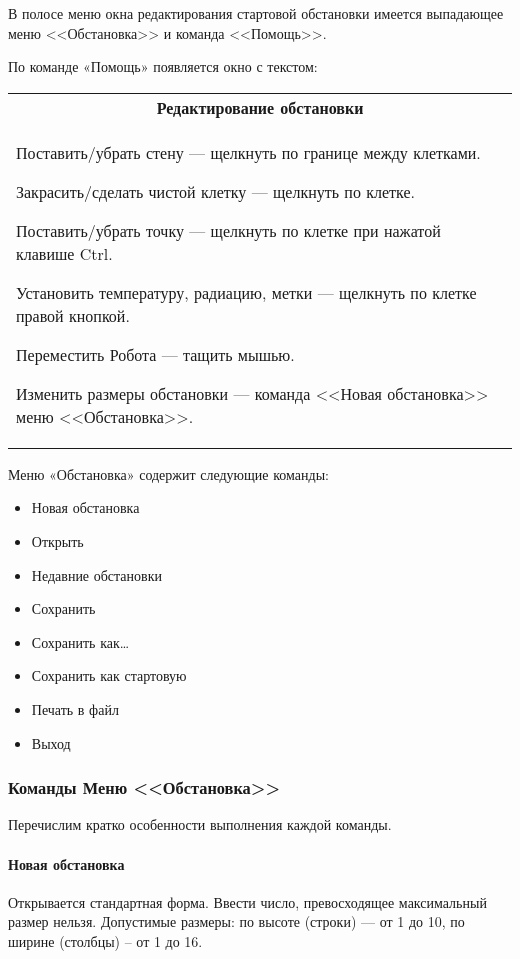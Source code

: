 В полосе меню окна редактирования стартовой обстановки  имеется выпадающее меню <<Обстановка>> и команда <<Помощь>>.

По команде  «Помощь» появляется окно с текстом:
\begin{center}
\begin{tabular}{|p{16cm}|}
\hline
\multicolumn{1}{|c|}{\textbf{Редактирование обстановки}}\\

Поставить/убрать стену --- щелкнуть по границе между клетками.

Закрасить/сделать чистой клетку --- щелкнуть по клетке.

Поставить/убрать точку --- щелкнуть по клетке при нажатой клавише Ctrl.

Установить температуру, радиацию, метки --- щелкнуть по клетке правой кнопкой.

Переместить Робота --- тащить мышью.

Изменить размеры обстановки --- команда <<Новая обстановка>> меню <<Обстановка>>.\\
\hline
\end{tabular}
\end{center}

Меню «Обстановка» содержит следующие команды:
\begin{itemize}
\item Новая обстановка
\item Открыть
\item Недавние обстановки
\item Сохранить
\item Сохранить как\dots
\item Сохранить как стартовую
\item Печать в файл
\item Выход
\end{itemize}

\subsubsection[Команды Меню ''Обстановка'']{Команды Меню <<Обстановка>>}

Перечислим кратко особенности выполнения каждой команды.

\paragraph{Новая обстановка} Открывается стандартная форма. Ввести число, превосходящее максимальный размер нельзя. Допустимые размеры: по высоте (строки) --- от 1 до 10, по ширине (столбцы) – от 1 до 16.

